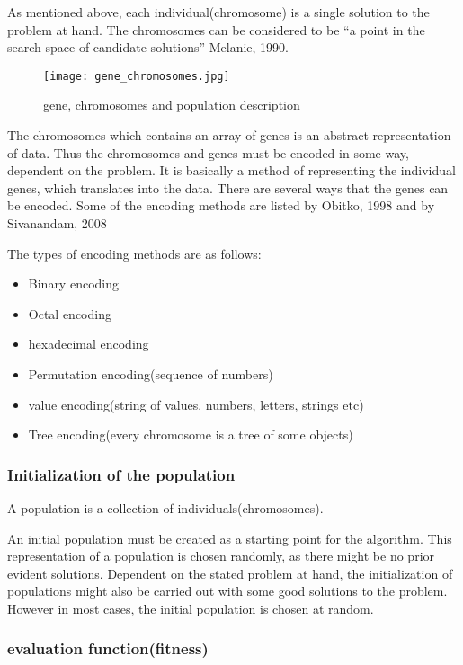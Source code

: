 As mentioned above, each individual(chromosome) is a single solution to the problem at hand. The chromosomes can be considered to be \enquote{a point in the search space of candidate solutions} \cite[pp. 7]{Melanie1990} Melanie, 1990.


\begin{figure}[!htbp]
\centering
\texttt{[image: gene\_chromosomes.jpg]}
\caption{gene, chromosomes and population description}
\label{fig:gene}
\end{figure}

The chromosomes which contains an array of genes is an abstract representation of data. Thus the chromosomes and genes must be encoded in some way, dependent on the problem. It is basically a method of representing the individual genes, which translates into the data.
There are several ways that the genes can be encoded. Some of the encoding methods are listed by Obitko, 1998 \cite{Marek1998} and by Sivanandam, 2008 \cite[pp.43]{Sivanandam2008}

The types of encoding methods are as follows:
\begin{itemize}
\item Binary encoding
\item Octal encoding
\item hexadecimal encoding
\item Permutation encoding(sequence of numbers)
\item value encoding(string of values. numbers, letters, strings etc)
\item Tree encoding(every chromosome is a tree of some objects)
\end{itemize}


\subsubsection*{Initialization of the population}

A population is a collection of individuals(chromosomes).

An initial population must be created as a starting point for the algorithm. This representation of a population is chosen randomly, as there might be no prior evident solutions. Dependent on the stated problem at hand, the initialization of populations might also be carried out with some good solutions to the problem. However in most cases, the initial population is chosen at random. \cite[pp. 41/42]{Sivanandam2008}


\subsubsection*{evaluation function(fitness)}

